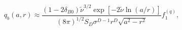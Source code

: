 \begin{equation}\label{EMTsigll1}
  q_b(a,r)\approx \frac{(1-2\delta _{B0})\tilde \nu ^{3/2}\exp\left[ -2
  \tilde \nu \ln(a/r)\right] }{(8\pi )^{1/2}S_D\sigma
  ^{D-1}r^D\sqrt{a^2-r^2}}f_1^{(q)},
\end{equation}

